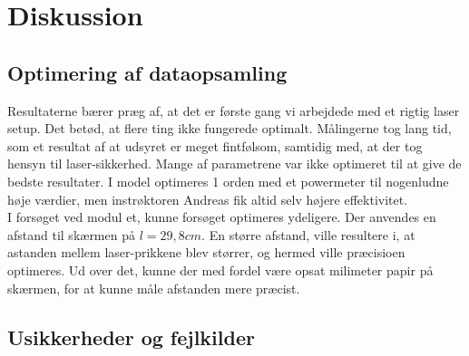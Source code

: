 \documentclass[main]{subfiles}
\begin{document}
\section{Diskussion}
\subsection{Optimering af dataopsamling}
Resultaterne bærer præg af, at det er første gang vi arbejdede med et rigtig laser setup. Det betød, at flere ting ikke fungerede optimalt. Målingerne tog lang tid, som et resultat af at udsyret er meget fintfølsom, samtidig med, at der tog hensyn til laser-sikkerhed. Mange af parametrene var ikke optimeret til at give de bedste resultater. I model optimeres 1 orden med et powermeter til nogenludne høje værdier, men instrøktoren Andreas fik altid selv højere effektivitet.
\\ I forsøget ved modul et, kunne forsøget optimeres ydeligere. Der anvendes en afstand til skærmen på $l = 29,8 cm$. En større afstand, ville resultere i, at astanden mellem laser-prikkene blev størrer, og hermed ville præcisioen optimeres. Ud over det, kunne der med fordel være opsat milimeter papir på skærmen, for at kunne måle afstanden mere præcist.
\subsection{Usikkerheder og fejlkilder}
\end{document}
